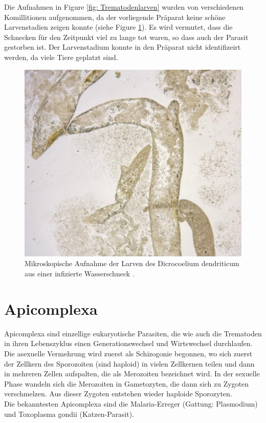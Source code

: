 \documentclass[oneside,10pt,a4paper]{report}
\begin{document}
				Die Aufnahmen in Figure \ref{fig: Trematodenlarven} wurden von verschiedenen Komillitionen aufgenommen, da der vorliegende Präparat keine schöne Larvenstadien zeigen konnte (siehe Figure \ref{fig: crapTrematodenlarven}). Es wird vermutet, dass die Schnecken für den Zeitpunkt viel zu lange tot waren, so dass auch der Parasit gestorben ist. Der Larvenstadium konnte in den Präparat nicht identifizeirt werden, da viele Tiere geplatzt sind.
				
				\begin{figure}[H]
					\centering
					\includegraphics[scale=0.5]{Trematodenlarven.jpg}
					\caption{Mikroskopische Aufnahme der Larven des Dicrocoelium dendriticum aus einer infizierte Wasserschneck .}
					\label{fig: crapTrematodenlarven}
				\end{figure}
	
	\chapter{Apicomplexa}
		Apicomplexa sind einzellige eukaryotische Parasiten, die wie auch die Trematoden in ihren Lebenszyklus einen Generationswechsel und Wirtswechsel durchlaufen.
		Die asexuelle Vermehrung wird zuerst als Schizogonie begonnen, wo sich  zuerst der Zellkern des Sporozoiten (sind haploid) in vielen Zellkernen teilen und dann in mehreren Zellen aufspalten, die als Merozoiten bezeichnet wird. In der sexuelle Phase wandeln sich die Merozoiten in Gametozyten, die dann sich zu Zygoten verschmelzen. Aus dieser Zygoten entstehen wieder haploide Sporozyten.\\
		Die bekanntesten Apicomplexa sind die Malaria-Erreger (Gattung: Plasmodium) und Toxoplasma gondii (Katzen-Parasit)\cite{wiki_apicomplexa}.
		
\end{document}
